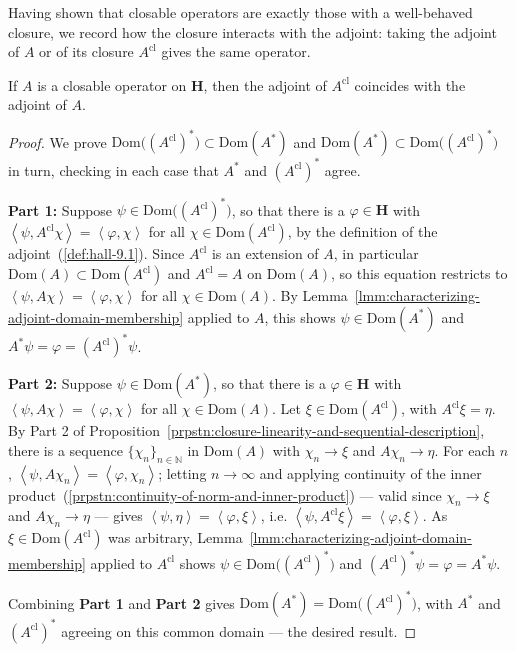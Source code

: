 Having shown that closable operators are exactly those with a well-behaved closure, we record how the closure interacts with the adjoint: taking the adjoint of $A$ or of its closure $A^{\text{cl}}$ gives the same operator.

\begin{proposition}
    \label{prpstn:hall-9.10}
    \leanok
    If $A$ is a closable operator on $\mathbf{H}$, then the adjoint of $A^{\text{cl}}$ coincides with the adjoint of $A$.
\end{proposition}
\begin{proof}
    \leanok
We prove $\text{Dom}\big( (A^{\text{cl}})^* \big) \subset \text{Dom}(A^*)$ and $\text{Dom}(A^*) \subset \text{Dom}\big( (A^{\text{cl}})^* \big)$ in turn, checking in each case that $A^*$ and $(A^{\text{cl}})^*$ agree.

\textbf{Part 1:} Suppose $\psi \in \text{Dom}\big( (A^{\text{cl}})^* \big)$, so that there is a $\varphi \in \mathbf{H}$ with $\left< \psi, A^{\text{cl}}\chi \right> = \left< \varphi, \chi \right>$ for all $\chi \in \text{Dom}(A^{\text{cl}})$, by the definition of the adjoint~(\ref{def:hall-9.1}). Since $A^{\text{cl}}$ is an extension of $A$, in particular $\text{Dom}(A) \subset \text{Dom}(A^{\text{cl}})$ and $A^{\text{cl}} = A$ on $\text{Dom}(A)$, so this equation restricts to $\left< \psi, A\chi \right> = \left< \varphi, \chi \right>$ for all $\chi \in \text{Dom}(A)$. By Lemma~\ref{lmm:characterizing-adjoint-domain-membership} applied to $A$, this shows $\psi \in \text{Dom}(A^*)$ and $A^*\psi = \varphi = (A^{\text{cl}})^*\psi$.

\textbf{Part 2:} Suppose $\psi \in \text{Dom}(A^*)$, so that there is a $\varphi \in \mathbf{H}$ with $\left< \psi, A\chi \right> = \left< \varphi, \chi \right>$ for all $\chi \in \text{Dom}(A)$. Let $\xi \in \text{Dom}(A^{\text{cl}})$, with $A^{\text{cl}}\xi = \eta$. By Part 2 of Proposition~\ref{prpstn:closure-linearity-and-sequential-description}, there is a sequence $\{ \chi_n \}_{n \in \mathbb{N}}$ in $\text{Dom}(A)$ with $\chi_n \to \xi$ and $A\chi_n \to \eta$. For each $n$, $\left< \psi, A\chi_n \right> = \left< \varphi, \chi_n \right>$; letting $n \to \infty$ and applying continuity of the inner product~(\ref{prpstn:continuity-of-norm-and-inner-product}) — valid since $\chi_n \to \xi$ and $A\chi_n \to \eta$ — gives $\left< \psi, \eta \right> = \left< \varphi, \xi \right>$, i.e. $\left< \psi, A^{\text{cl}}\xi \right> = \left< \varphi, \xi \right>$. As $\xi \in \text{Dom}(A^{\text{cl}})$ was arbitrary, Lemma~\ref{lmm:characterizing-adjoint-domain-membership} applied to $A^{\text{cl}}$ shows $\psi \in \text{Dom}\big( (A^{\text{cl}})^* \big)$ and $(A^{\text{cl}})^*\psi = \varphi = A^*\psi$.

Combining \textbf{Part 1} and \textbf{Part 2} gives $\text{Dom}(A^*) = \text{Dom}\big( (A^{\text{cl}})^* \big)$, with $A^*$ and $(A^{\text{cl}})^*$ agreeing on this common domain — the desired result.
\end{proof}

